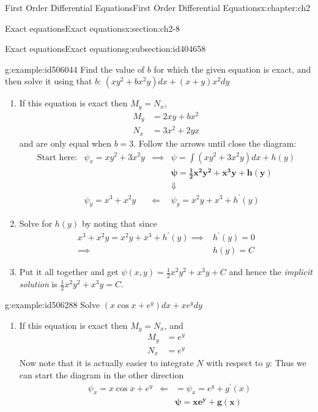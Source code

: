 \documentclass[oneside,10pt,]{book}
\numberwithin{equation}{section}
\numberwithin{equation}{section}
\newcommand{\amp}{&}
\begin{document}
\begin{chapterptx}{First Order Differential Equations}{}{First Order Differential Equations}{}{}{x:chapter:ch2}
\begin{sectionptx}{Exact equations}{}{Exact equations}{}{}{x:section:ch2-8}
\begin{subsectionptx}{Exact equations}{}{Exact equations}{}{}{g:subsection:id404658}
\begin{example}{}{g:example:id506044}
Find the value of \(b\) for which the given equation is exact, and then solve it using that \(b\): \(\left(xy^{2}+bx^{2}y\right)dx+\left(x+y\right)x^{2}dy\)%
\begin{enumerate}
\item{}If this equation is exact then \(M_{y}=N_{x}\),%
\begin{align*}
M_{y} \amp =2xy+bx^{2}\\
N_{x} \amp =3x^{2}+2yx
\end{align*}
and are only equal when \(b=3\). Follow the arrows until close the diagram:%
\begin{align*}
\text{Start here:} \amp \psi_{x}=xy^{2}+3x^{2}y \amp \implies \amp \psi=\int\left(xy^{2}+3x^{2}y\right)dx+h(y)\\
\amp  \amp  \amp \boldsymbol{\psi=\frac{1}{2}x^{2}y^{2}+x^{3}y+h(y)}\\
\amp  \amp  \amp \Downarrow\\
\amp \psi_{y}=x^{3}+x^{2}y \amp \Longleftarrow \amp \psi_{y}=x^{2}y+x^{3}+h^{\prime}(y)
\end{align*}
%
\item{}Solve for \(h(y)\) by noting that since%
\begin{align*}
x^{3}+x^{2}y=x^{2}y+x^{3}+h^{\prime}(y)\implies \amp h^{\prime}(y)=0\\
\implies \amp h(y)=C
\end{align*}
%
\item{}Put it all together and get \(\psi(x,y)=\frac{1}{2}x^{2}y^{2}+x^{3}y+C\) and hence the \emph{implicit solution} is \(\frac{1}{2}x^{2}y^{2}+x^{3}y=C.\)%
\end{enumerate}
\end{example}
\begin{example}{}{g:example:id506288}%
Solve \(\left(x\cos x+e^{y}\right)dx+xe^{y}dy\)%
%
\begin{enumerate}
\item{}If this equation is exact then \(M_{y}=N_{x}\), and%
\begin{align*}
M_{y} \amp =e^{y}\\
N_{x} \amp =e^{y}
\end{align*}
Now note that it is actually easier to integrate \(N\) with respect to \(y\): Thus we can start the diagram in the other direction%
\begin{align*}
\amp \psi_{x}=x\cos x+e^{y} \amp \Longleftarrow \amp =\psi_{x}=e^{y}+g^{\prime}(x)\\
\amp  \amp  \amp \boldsymbol{\psi=xe^{y}+g(x)}\\

\end{align*}
\end{enumerate}
\end{example}
\end{subsectionptx}
\end{sectionptx}
\end{chapterptx}
\end{document}
